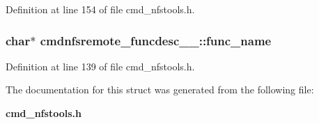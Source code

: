Definition at line 154 of file cmd\_\-nfstools.h.
\subsubsection[{func\_\-name}]{\setlength{\rightskip}{0pt plus 5cm}char$\ast$ {\bf cmdnfsremote\_\-funcdesc\_\-\_\-::func\_\-name}}\label{structcmdnfsremote__funcdesc_____ac3f9774665e3e6a426fbfcbe719027f}




Definition at line 139 of file cmd\_\-nfstools.h.

The documentation for this struct was generated from the following file:\begin{CompactItemize}
\item 
{\bf cmd\_\-nfstools.h}\end{CompactItemize}
